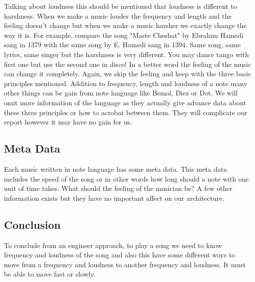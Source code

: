 \documentclass{report}
\begin{document}
Talking about loudness this should be mentioned that loudness is different to harshness. When we make a music louder the frequency and length and the feeling doesn't change but when we make a music harsher we exactly change the way it is. For example, compare the song "Maste Cheshat" by Ebrahim Hamedi sang in 1379 with the same song by E. Hamedi sang in 1394. Same song, same lyrics, same singer but the harshness is very different. You may dance tango with first one but use the second one in disco! In a better word the feeling of the music can change it completely. Again, we skip the feeling and keep with the three basic principles mentioned.\newline
Addition to frequency, length and loudness of a note many other things can be gain from note language like Bemol, Diez or Dot. We will omit more information of the language as they actually give advance data about these three principles or how to acrobat between them. They will complicate our report however it may have no gain for us.

\subsection{Meta Data}
Each music written in note language has some meta data. This meta data includes the speed of the song or in other words how long should a note with one unit of time takes. What should the feeling of the musician be? A few other information exists but they have no important affect on our architecture. 


\subsection{Conclusion}
To conclude from an engineer approach, to play a song we need to know frequency and loudness of the song and also this have some different ways to move from a frequency and loudness to another frequency and loudness. It must be able to move fast or slowly. 
\end{document}
